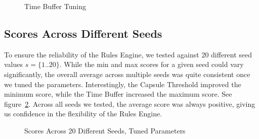 \documentclass[11pt, oneside]{article}   	%
\begin{document}
\begin{figure}[h!]
  \centering
  \caption{Time Buffer Tuning}
  \label{fig:buffer}
 \end{figure}


\subsection{Scores Across Different Seeds}

To ensure the reliability of the Rules Engine, we tested against 20 different seed values $s = \{1..20\}$. While the min and max scores for a given seed could vary significantly, the overall average across multiple seeds was quite consistent once we tuned the parameters. Interestingly, the Capsule Threshold improved the minimum score, while the Time Buffer increased the maximum score. See figure~\ref{fig:seeds}. Across all seeds we tested, the average score was always positive, giving us confidence in the flexibility of the Rules Engine.

\begin{figure}[h!]
  \centering
  \caption{Scores Across 20 Different Seeds, Tuned Parameters}
  \label{fig:seeds}
 \end{figure}
\end{document}

